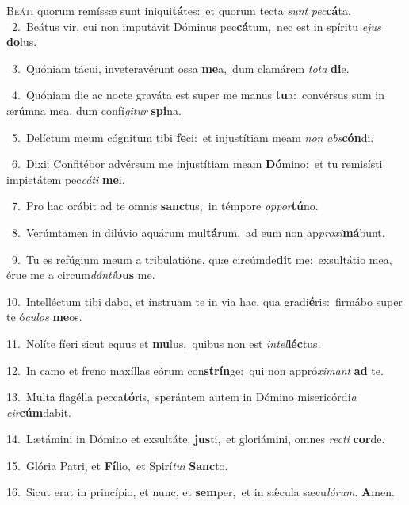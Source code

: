\lettrine{\initial\textcolor{\initialcolor}{B}}{eáti} quorum remíssæ sunt iniqui\-\textbf{tá}\-tes:~\star et quorum tecta \textit{sunt} \textit{pec}\-\textbf{cá}ta.\\
{\numbfont\textcolor{\numbcolor}{~2.}}~Beátus vir, cui non imputávit Dóminus pec\-\textbf{cá}\-tum,~\star nec est in spíritu \textit{e}\-\textit{jus} \textbf{do}\-lus.\par
{\numbfont\textcolor{\numbcolor}{~3.}}~Quóniam tácui, inveteravérunt ossa \textbf{me}\-a,~\star dum clamárem \textit{to}\-\textit{ta} \textbf{di}\-e.\par
{\numbfont\textcolor{\numbcolor}{~4.}}~Quóniam die ac nocte graváta est super me manus \textbf{tu}\-a:~\star convérsus sum in ærúmna mea, dum confí\-\textit{gi}\-\textit{tur} \textbf{spi}\-na.\par
{\numbfont\textcolor{\numbcolor}{~5.}}~Delíctum meum cógnitum tibi \textbf{fe}\-ci:~\star et injustítiam meam \textit{non} \textit{abs}\-\textbf{cón}di.\par
{\numbfont\textcolor{\numbcolor}{~6.}}~Dixi: Confitébor advérsum me injustítiam meam \textbf{Dó}\-mino:~\star et tu remisísti impietátem pec\-\textit{cá}\-\textit{ti} \textbf{me}\-i.\par
{\numbfont\textcolor{\numbcolor}{~7.}}~Pro hac orábit ad te omnis \textbf{sanc}\-tus,~\star in témpore \textit{op}\-\textit{por}\textbf{tú}no.\par
{\numbfont\textcolor{\numbcolor}{~8.}}~Verúmtamen in dilúvio aquárum mul\-\textbf{tá}\-rum,~\star ad eum non ap\-\textit{pro}\-\textit{xi}\textbf{má}bunt.\par
{\numbfont\textcolor{\numbcolor}{~9.}}~Tu es refúgium meum a tribulatióne, quæ circúmde\textbf{dit} me:~\star exsultátio mea, érue me a circum\-\textit{dán}\-\textit{ti}\textbf{bus} me.\par
{\numbfont\textcolor{\numbcolor}{10.}}~Intelléctum tibi dabo, et ínstruam te in via hac, qua gradi\-\textbf{é}\-ris:~\star firmábo super te ó\-\textit{cu}\-\textit{los} \textbf{me}\-os.\par
{\numbfont\textcolor{\numbcolor}{11.}}~Nolíte fíeri sicut equus et \textbf{mu}\-lus,~\star quibus non est \textit{in}\-\textit{tel}\textbf{léc}tus.\par
{\numbfont\textcolor{\numbcolor}{12.}}~In camo et freno maxíllas eórum con\-\textbf{strín}\-ge:~\star qui non appró\-\textit{xi}\-\textit{mant} \textbf{ad} te.\par
{\numbfont\textcolor{\numbcolor}{13.}}~Multa flagélla pecca\-\textbf{tó}\-ris,~\star sperántem autem in Dómino misericórdi\textit{a} \textit{cir}\-\textbf{cúm}dabit.\par
{\numbfont\textcolor{\numbcolor}{14.}}~Lætámini in Dómino et exsultáte, \textbf{jus}\-ti,~\star et gloriámini, omnes \textit{rec}\-\textit{ti} \textbf{cor}\-de.\par
{\numbfont\textcolor{\numbcolor}{15.}}~Glória Patri, et \textbf{Fí}\-lio,~\star et Spirí\-\textit{tu}\-\textit{i} \textbf{Sanc}\-to.\par
{\numbfont\textcolor{\numbcolor}{16.}}~Sicut erat in princípio, et nunc, et \textbf{sem}\-per,~\star et in sǽcula sæcu\-\textit{ló}\-\textit{rum}. \textbf{A}\-men.\par
